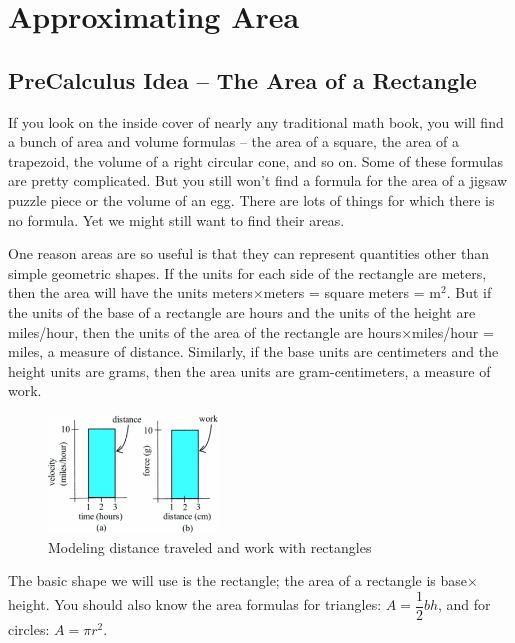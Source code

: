 \section{Approximating Area}
\label{sec:area-approx}
\subsection{PreCalculus Idea – The Area of a Rectangle}
If you look on the inside cover of nearly any traditional math book, you will find a bunch of area and volume formulas – the area of a square, the area of a trapezoid, the volume of a right circular cone, and so on. Some of these formulas are pretty complicated. But you still won't find a formula for the area of a jigsaw puzzle piece or the volume of an egg. There are lots of things for which there is no formula. Yet we might still want to find their areas.

One reason areas are so useful is that they can represent quantities other than simple geometric shapes. If the units for each side of the rectangle are meters, then the area will have the units meters$\times$meters = square meters = m$^2$. But if the units of the base of a rectangle are hours and the units of the height are miles/hour, then the units of the area of the rectangle are hours$\times$miles/hour = miles, a measure of distance. Similarly, if the base units are centimeters and the height units are grams, then the area units are gram-centimeters, a measure of work.

\begin{figure}[!ht]
  \centering
    \includegraphics[width=0.4\textwidth]{img/chap5/image065.png}
    \caption{Modeling distance traveled and work with rectangles}
    \label{fig:5-2-rectangles}
\end{figure}
The basic shape we will use is the rectangle; the area of a rectangle is base$\times$height. You should also know the area formulas for triangles: $A=\dfrac{1}{2}bh$, and for circles: $A=\pi r^2$.

